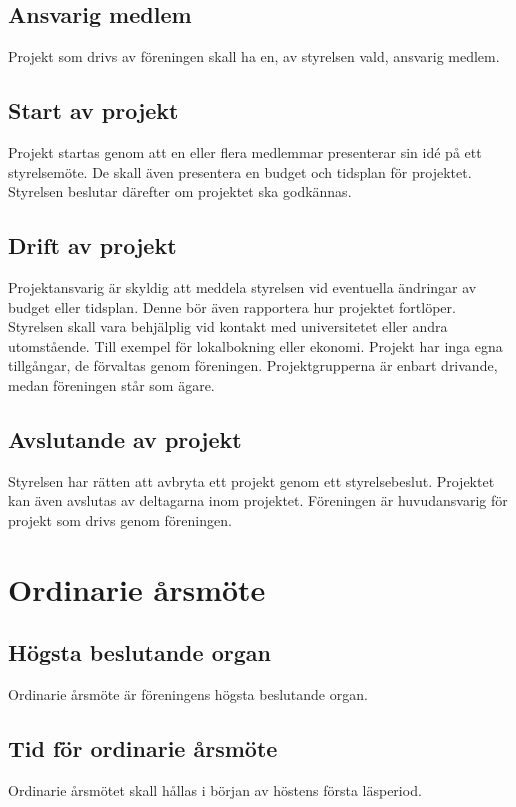 \documentclass[11pt,a4paper]{article}
\begin{document}
\subsection{Ansvarig medlem}
Projekt som drivs av föreningen skall ha en, av styrelsen vald, ansvarig medlem.

\subsection{Start av projekt}
Projekt startas genom att en eller flera medlemmar presenterar sin idé på
ett styrelsemöte. De skall även presentera en budget och tidsplan för
projektet. Styrelsen beslutar därefter om projektet ska godkännas.

\subsection{Drift av projekt}
Projektansvarig är skyldig att meddela styrelsen vid eventuella ändringar
av budget eller tidsplan. Denne bör även rapportera hur projektet
fortlöper. Styrelsen skall vara behjälplig vid kontakt med universitetet
eller andra utomstående. Till exempel för lokalbokning eller ekonomi.
Projekt har inga egna tillgångar, de förvaltas genom föreningen.
Projektgrupperna är enbart drivande, medan föreningen står som ägare.

\subsection{Avslutande av projekt}
Styrelsen har rätten att avbryta ett projekt genom ett styrelsebeslut.
Projektet kan även avslutas av deltagarna inom projektet. Föreningen är
huvudansvarig för projekt som drivs genom föreningen.



\section{Ordinarie årsmöte}

\subsection{Högsta beslutande organ}
Ordinarie årsmöte är föreningens högsta beslutande organ.
\subsection{Tid för ordinarie årsmöte}
Ordinarie årsmötet skall hållas i början av höstens första läsperiod. 
\end{document}
